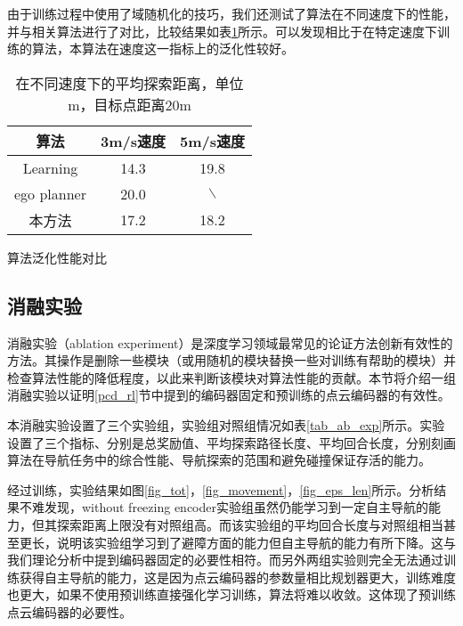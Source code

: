 由于训练过程中使用了域随机化的技巧，我们还测试了算法在不同速度下的性能，并与相关算法进行了对比，比较结果如表\ref{tab_generalize}所示。可以发现相比于在特定速度下训练的算法，本算法在速度这一指标上的泛化性较好。

\begin{table}
    \centering
    \begin{tabular}{ccc}
    \hline
        算法 & 3m/s速度 & 5m/s速度 \\ \hline
        Learning & 14.3 & 19.8 \\ 
        ego planner & 20.0 & $\backslash$ \\ 
        本方法 & 17.2 & 18.2 \\ \hline
    \end{tabular}
    \caption{算法泛化性能对比}
    \caption*{在不同速度下的平均探索距离，单位m，目标点距离20m}
    \label{tab_generalize}
\end{table}

\subsection{消融实验}

消融实验（ablation experiment）是深度学习领域最常见的论证方法创新有效性的方法。其操作是删除一些模块（或用随机的模块替换一些对训练有帮助的模块）并检查算法性能的降低程度，以此来判断该模块对算法性能的贡献。本节将介绍一组消融实验以证明\ref{pcd_rl}节中提到的编码器固定和预训练的点云编码器的有效性。

本消融实验设置了三个实验组，实验组对照组情况如表\ref{tab_ab_exp}所示。实验设置了三个指标、分别是总奖励值、平均探索路径长度、平均回合长度，分别刻画算法在导航任务中的综合性能、导航探索的范围和避免碰撞保证存活的能力。

经过训练，实验结果如图\ref{fig_tot}，\ref{fig_movement}，\ref{fig_eps_len}所示。分析结果不难发现，without freezing encoder实验组虽然仍能学习到一定自主导航的能力，但其探索距离上限没有对照组高。而该实验组的平均回合长度与对照组相当甚至更长，说明该实验组学习到了避障方面的能力但自主导航的能力有所下降。这与我们理论分析中提到编码器固定的必要性相符。而另外两组实验则完全无法通过训练获得自主导航的能力，这是因为点云编码器的参数量相比规划器更大，训练难度也更大，如果不使用预训练直接强化学习训练，算法将难以收敛。这体现了预训练点云编码器的必要性。

